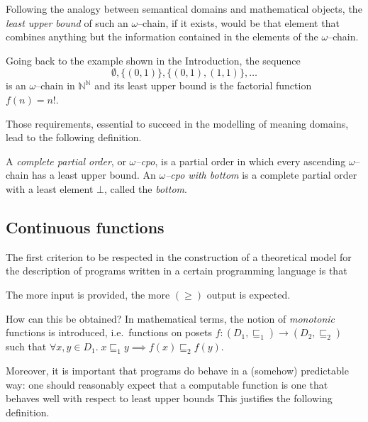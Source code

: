 Following the analogy between semantical domains and mathematical objects, the \emph{least upper bound} of such an \(\omega\)--chain, if it exists, would be that element that combines anything but the information contained in the elements of the \(\omega\)--chain. %

Going back to the example shown in the Introduction, the sequence
\begin{equation*}
  \emptyset, \lbrace (0,1) \rbrace, \lbrace (0,1), (1,1) \rbrace, \dotsc
\end{equation*}
is an \(\omega\)--chain in \(\mathbb{N}^\mathbb{N}\) and its least upper bound is the factorial function \(f(n) = n!\). %

Those requirements, essential to succeed in the modelling of meaning domains, lead to the following definition.

\begin{dfn}
  A \emph{complete partial order}, or \emph{\(\omega\)--cpo}, is a partial order in which every ascending \(\omega\)--chain has a least upper bound. %
  An \emph{\(\omega\)--cpo with bottom} is a complete partial order with a least element %
  \(\bot\), called the \emph{bottom}. %
\end{dfn}

\subsection[Continuous functions]{Continuous functions}

The first criterion to be respected in the construction of a theoretical model for the description of programs written in a certain programming language is that
\begin{center}
  The more input is provided, the more \((\ge)\) output is expected.
\end{center}
How can this be obtained? In mathematical terms, the notion of \emph{monotonic} functions is introduced, i.e.\ functions on posets%
\(f \colon (D_1,{}\sqsubseteq_1) \to (D_2,{}\sqsubseteq_2)\) such that
\(
  \forall{}x,y \in D_1.\; x \sqsubseteq_1 y \implies f(x) \sqsubseteq_2 f(y).
\)

Moreover, it is important that programs do behave in a (somehow) predictable way: one should reasonably expect that a computable function is one that behaves well with respect to least upper bounds
This justifies the following definition.

